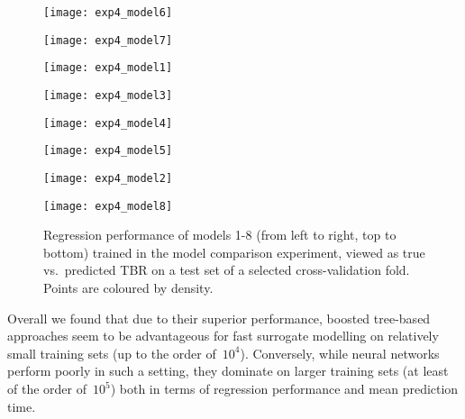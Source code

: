 \begin{figure}
	\centering
	\begin{minipage}{0.5\linewidth}
		\centering
		\texttt{[image: exp4\_model6]}
	\end{minipage}\hfill%
	\begin{minipage}{0.5\linewidth}
		\centering
		\texttt{[image: exp4\_model7]}
	\end{minipage}

	\begin{minipage}{0.5\linewidth}
		\centering
		\texttt{[image: exp4\_model1]}
	\end{minipage}\hfill%
	\begin{minipage}{0.5\linewidth}
		\centering
		\texttt{[image: exp4\_model3]}
	\end{minipage}

	\begin{minipage}{0.5\linewidth}
		\centering
		\texttt{[image: exp4\_model4]}
	\end{minipage}\hfill%
	\begin{minipage}{0.5\linewidth}
		\centering
		\texttt{[image: exp4\_model5]}
	\end{minipage}

	\begin{minipage}{0.5\linewidth}
		\centering
		\texttt{[image: exp4\_model2]}
	\end{minipage}\hfill%
	\begin{minipage}{0.5\linewidth}
		\centering
		\texttt{[image: exp4\_model8]}
	\end{minipage}

	\caption{Regression performance of models 1-8 (from left to right, top to
		bottom) trained in the model comparison experiment, viewed
		as true vs.~predicted TBR on a test set of a selected cross-validation
		fold. Points are coloured by density.}
	\label{fig:reg-performance}
\end{figure}

Overall we found that due to their superior performance, boosted tree-based
approaches seem to be advantageous for fast surrogate modelling on relatively small training
sets (up to the order of~$10^4$). Conversely, while neural networks perform
poorly in such a setting, they dominate on larger training sets (at least of the
order of~$10^5$) both in terms of regression performance and mean prediction time.

